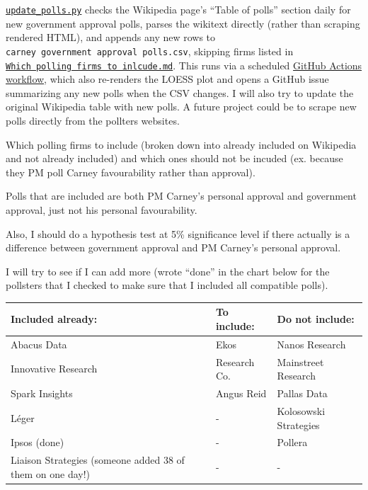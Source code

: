 \documentclass[
]{article}
\newcounter{none} %
\begin{document}
\href{update_polls.py}{\texttt{update\_polls.py}} checks the Wikipedia
page's ``Table of polls'' section daily for new government approval
polls, parses the wikitext directly (rather than scraping rendered
HTML), and appends any new rows to
\texttt{carney\ government\ approval\ polls.csv}, skipping firms listed
in
\href{Which\%20polling\%20firms\%20to\%20inlcude.md}{\texttt{Which\ polling\ firms\ to\ inlcude.md}}.
This runs via a scheduled
\href{.github/workflows/update-polls.yml}{GitHub Actions workflow},
which also re-renders the LOESS plot and opens a GitHub issue
summarizing any new polls when the CSV changes. I will also try to
update the original Wikipedia table with new polls. A future project
could be to scrape new polls directly from the pollters websites.

Which polling firms to include (broken down into already included on
Wikipedia and not already included) and which ones should not be incuded
(ex. because they PM poll Carney favourability rather than approval).

Polls that are included are both PM Carney's personal approval and
government approval, just not his personal favourability.

Also, I should do a hypothesis test at 5\% significance level if there
actually is a difference between government approval and PM Carney's
personal approval.

I will try to see if I can add more (wrote ``done'' in the chart below
for the pollsters that I checked to make sure that I included all
compatible polls).

{\def\LTcaptype{none} %
\begin{longtable}[]{@{}lll@{}}
\toprule\noalign{}
Included already: & To include: & Do not include: \\
\midrule\noalign{}
\endhead
\bottomrule\noalign{}
\endlastfoot
Abacus Data & Ekos & Nanos Research \\
Innovative Research & Research Co. & Mainstreet Research \\
Spark Insights & Angus Reid & Pallas Data \\
Léger & - & Kolosowski Strategies \\
Ipsos (done) & - & Pollera \\
Liaison Strategies (someone added 38 of them on one day!) & - & - \\
\end{longtable}
}
\end{document}
